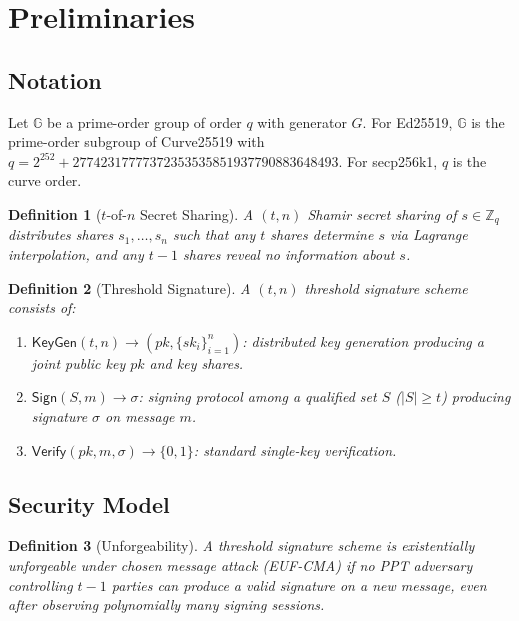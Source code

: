 \documentclass[11pt,a4paper]{article}
\newtheorem{definition}{Definition}[section]
\begin{document}
\section{Preliminaries}
\label{sec:prelim}

\subsection{Notation}

Let $\mathbb{G}$ be a prime-order group of order $q$ with generator $G$.
For Ed25519, $\mathbb{G}$ is the prime-order subgroup of Curve25519 with
$q = 2^{252} + 27742317777372353535851937790883648493$.  For secp256k1,
$q$ is the curve order.

\begin{definition}[$t$-of-$n$ Secret Sharing]
    A $(t, n)$ Shamir secret sharing of $s \in \mathbb{Z}_q$ distributes
    shares $s_1, \ldots, s_n$ such that any $t$ shares determine $s$ via
    Lagrange interpolation, and any $t-1$ shares reveal no information
    about $s$.
\end{definition}

\begin{definition}[Threshold Signature]
    A $(t, n)$ threshold signature scheme consists of:
    \begin{enumerate}[label=(\roman*)]
        \item $\mathsf{KeyGen}(t, n) \to (pk, \{sk_i\}_{i=1}^n)$:
        distributed key generation producing a joint public key $pk$ and
        key shares.
        \item $\mathsf{Sign}(S, m) \to \sigma$: signing protocol among
        a qualified set $S$ ($|S| \geq t$) producing signature $\sigma$
        on message $m$.
        \item $\mathsf{Verify}(pk, m, \sigma) \to \{0,1\}$: standard
        single-key verification.
    \end{enumerate}
\end{definition}

\subsection{Security Model}

\begin{definition}[Unforgeability]
    A threshold signature scheme is \emph{existentially unforgeable under
    chosen message attack} (EUF-CMA) if no PPT adversary controlling
    $t-1$ parties can produce a valid signature on a new message, even
    after observing polynomially many signing sessions.
\end{definition}
\end{document}

